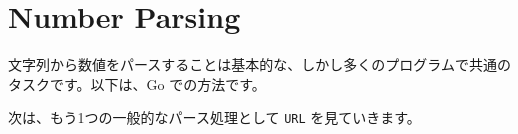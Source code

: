 \section{Number Parsing}

文字列から数値をパースすることは基本的な、しかし多くのプログラムで共通のタスクです。以下は、Go での方法です。




次は、もう1つの一般的なパース処理として \texttt{URL} を見ていきます。